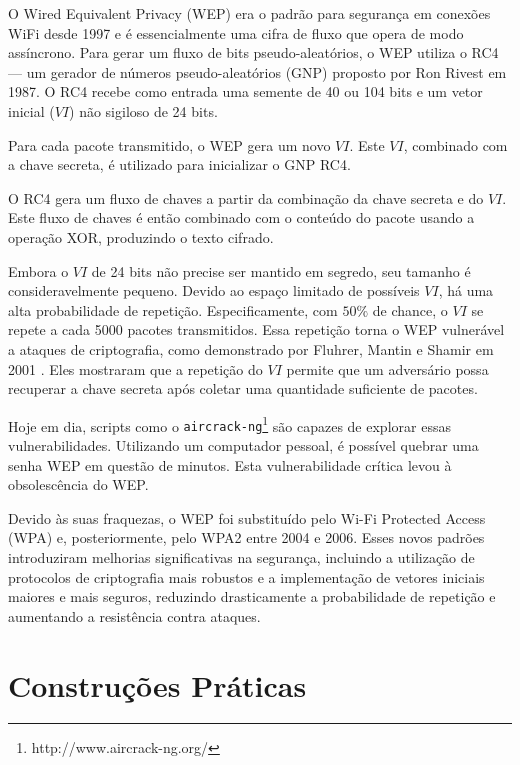 \begin{example}
  O Wired Equivalent Privacy (WEP) era o padrão para segurança em conexões WiFi desde 1997 e é essencialmente uma cifra de fluxo que opera de modo assíncrono.
  Para gerar um fluxo de bits pseudo-aleatórios, o WEP utiliza o RC4 \cite{Rivest16} — um gerador de números pseudo-aleatórios (GNP) proposto por Ron Rivest em 1987.
  O RC4 recebe como entrada uma semente de 40 ou 104 bits e um vetor inicial ($VI$) não sigiloso de 24 bits.

  Para cada pacote transmitido, o WEP gera um novo $VI$.
  Este $VI$, combinado com a chave secreta, é utilizado para inicializar o GNP RC4.

  O RC4 gera um fluxo de chaves a partir da combinação da chave secreta e do $VI$.
  Este fluxo de chaves é então combinado com o conteúdo do pacote usando a operação XOR, produzindo o texto cifrado.

  Embora o $VI$ de 24 bits não precise ser mantido em segredo, seu tamanho é consideravelmente pequeno.
  Devido ao espaço limitado de possíveis $VI$, há uma alta probabilidade de repetição.
  Especificamente, com $50\%$ de chance, o $VI$ se repete a cada 5000 pacotes transmitidos.
  Essa repetição torna o WEP vulnerável a ataques de criptografia, como demonstrado por Fluhrer, Mantin e Shamir em 2001 \cite{Fluhrer01}.
  Eles mostraram que a repetição do $VI$ permite que um adversário possa recuperar a chave secreta após coletar uma quantidade suficiente de pacotes.

  Hoje em dia, scripts como o {\tt aircrack-ng}\footnote{http://www.aircrack-ng.org/} são capazes de explorar essas vulnerabilidades.
  Utilizando um computador pessoal, é possível quebrar uma senha WEP em questão de minutos.
  Esta vulnerabilidade crítica levou à obsolescência do WEP.

  Devido às suas fraquezas, o WEP foi substituído pelo Wi-Fi Protected Access (WPA) e, posteriormente, pelo WPA2 entre 2004 e 2006.
  Esses novos padrões introduziram melhorias significativas na segurança, incluindo a utilização de protocolos de criptografia mais robustos e a implementação de vetores iniciais maiores e mais seguros, reduzindo drasticamente a probabilidade de repetição e aumentando a resistência contra ataques.

\end{example}

\section{Construções Práticas}
\label{sec:construcoes-praticas}

